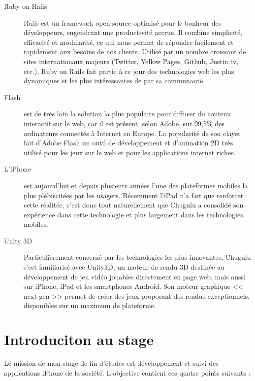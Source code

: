 \begin{description}  \item[Ruby on Rails] Rails est un framework open-source optimisé pour le bonheur des développeurs, engendrant une productivité accrue. Il combine simplicité, efficacité et modularité, ce qui nous permet de répondre facilement et rapidement aux besoins de nos clients. Utilisé par un nombre croissant de sites internationaux majeurs (Twitter, Yellow Pages, Github, Justin.tv, etc.), Ruby on Rails fait partie à ce jour des technologies web les plus dynamiques et les plus intéressantes de par sa communauté.

\item[Flash] est de très loin la solution la plus populaire pour diffuser du contenu interactif sur le web, car il est présent, selon Adobe, sur 99,5\% des ordinateurs connectés à Internet en Europe. La popularité de son clayer fait d’Adobe Flash un outil de développement et d’animation 2D très utilisé pour les jeux sur le web et pour les applications internet riches.

\item[L'iPhone] est aujourd'hui et depuis plusieurs années l'une des plateformes mobiles la plus plébiscitées par les usagers. Récemment l'iPad n'a fait que renforcer cette réalitée, c'est donc tout naturellement que Chugulu a consolidé son expérience dans cette technologie et plus largement dans les technologies mobiles.

\item[Unity 3D] Particulièrement concerné par les technologies les plus innovantes, Chugulu s’est familiarisé avec Unity3D, un moteur de rendu 3D destinée au développement de jeu vidéo jouables directement en page web, mais aussi sur iPhone, iPad et les smartphones Android. Son moteur graphique << next gen >> permet de créer des jeux proposant des rendus exceptionnels, disponibles sur un maximum de plateforme.
\end{description} %

\section{Introduciton au stage} %
Le mission de mon stage de fin d'études est développement et suivi des applications iPhone de la société. L'objective contient ces quatre points suivants : 


